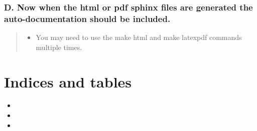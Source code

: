 \documentclass[letterpaper,10pt,english]{sphinxmanual}
\begin{document}
\subsection{D. Now when the html or pdf sphinx files are generated the auto-documentation should be included.}
\label{docs/Process:d-now-when-the-html-or-pdf-sphinx-files-are-generated-the-auto-documentation-should-be-included}\begin{quote}
\begin{itemize}
\item {} 
You may need to use the make html and make latexpdf commands multiple times.

\end{itemize}
\end{quote}


\chapter{Indices and tables}
\label{index:indices-and-tables}\begin{itemize}
\item {} 

\item {} 

\item {} 

\end{itemize}



\renewcommand{\indexname}{Index}
\printindex
\end{document}
